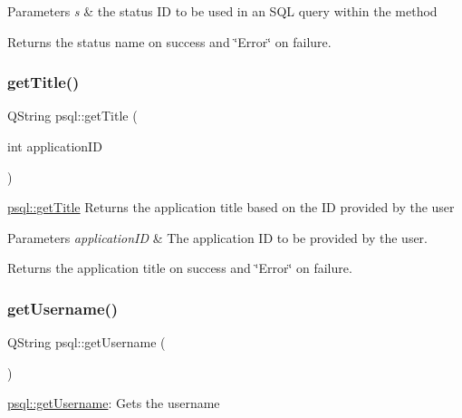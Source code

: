 \begin{DoxyParams}{Parameters}
{\em s} & the status ID to be used in an S\+QL query within the method \\
\hline
\end{DoxyParams}
\begin{DoxyReturn}{Returns}
the status name on success and \char`\"{}\+Error\char`\"{} on failure. 
\end{DoxyReturn}
\mbox{\label{classpsql_ada9e3be3e0866011edf53e30ec510afc}} 
\subsubsection{\texorpdfstring{get\+Title()}{getTitle()}}
{\footnotesize\ttfamily Q\+String psql\+::get\+Title (\begin{DoxyParamCaption}\item[{int}]{application\+ID }\end{DoxyParamCaption})}



\hyperlink{classpsql_ada9e3be3e0866011edf53e30ec510afc}{psql\+::get\+Title} Returns the application title based on the ID provided by the user 


\begin{DoxyParams}{Parameters}
{\em application\+ID} & The application ID to be provided by the user. \\
\hline
\end{DoxyParams}
\begin{DoxyReturn}{Returns}
the application title on success and \char`\"{}\+Error\char`\"{} on failure. 
\end{DoxyReturn}
\mbox{\label{classpsql_aecc9fd93dc5ca0c4f4a63d445a36d166}} 
\subsubsection{\texorpdfstring{get\+Username()}{getUsername()}}
{\footnotesize\ttfamily Q\+String psql\+::get\+Username (\begin{DoxyParamCaption}{ }\end{DoxyParamCaption})}



\hyperlink{classpsql_aecc9fd93dc5ca0c4f4a63d445a36d166}{psql\+::get\+Username}\+: Gets the username 

